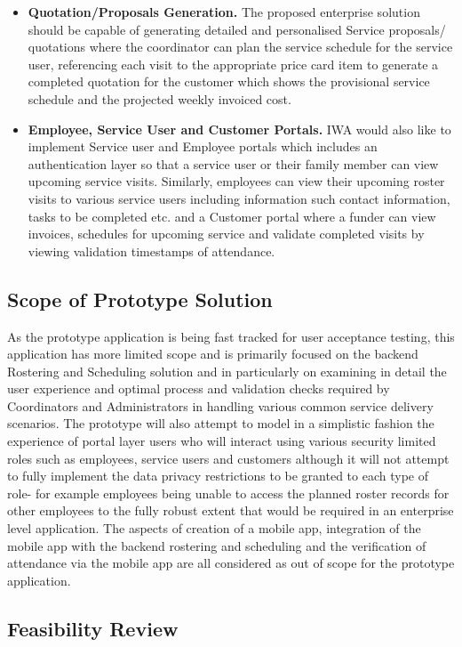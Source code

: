 \documentclass[a4paper,Times New Roman 11pt]{article}
\begin{document}
\begin{samepage}
\begin{samepage}
\begin{itemize}
\pagebreak
\item\textbf {Quotation/Proposals Generation.} The proposed enterprise solution should be capable of generating detailed and personalised Service proposals/ quotations where the coordinator can plan the service schedule for the service user, referencing each visit to the appropriate price card item to generate a completed quotation for the customer which shows the provisional service schedule and the projected weekly invoiced cost.
\item \textbf {Employee, Service User and Customer Portals.} IWA would also like to implement Service user and Employee portals which includes an authentication layer so that a service user or their family member can view upcoming service visits. Similarly, employees can view their upcoming roster visits to various service users including information such contact information, tasks to be completed etc. and a Customer portal where a funder can view invoices, schedules for upcoming service and validate completed visits by viewing validation timestamps of attendance.
\end{itemize}
\subsection {Scope of Prototype Solution}
As the prototype application is being fast tracked for user acceptance testing, this application has more limited scope and is primarily focused on the backend Rostering and Scheduling solution and in particularly on examining in detail the user experience and optimal process and validation checks required by Coordinators and Administrators in handling various common service delivery scenarios.
The prototype will also attempt to model in a simplistic fashion the experience of portal layer users who will interact using various security limited roles such as employees, service users and customers although it will not attempt to fully implement the data privacy restrictions to be granted to each type of role- for example employees being unable to access the planned roster records for other employees to the fully robust extent that would be required in an enterprise level application.
The aspects of creation of a mobile app, integration of the mobile app with the backend rostering and scheduling and the verification of attendance via the mobile app are all considered as out of scope for the prototype application.
\end{samepage}
\pagebreak
\subsection {Feasibility Review}


\end{samepage}
\end{document}
